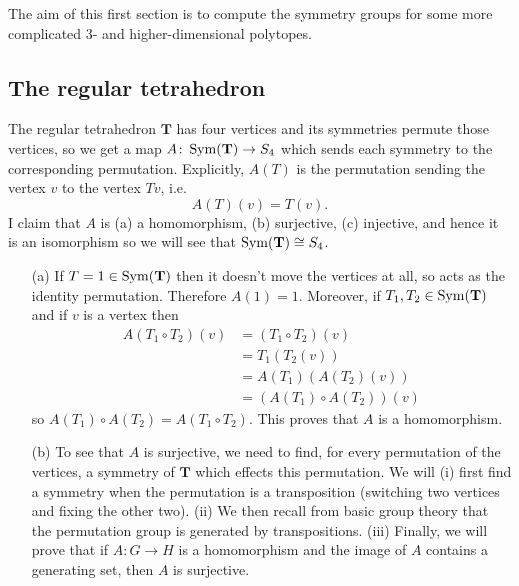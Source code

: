 \documentclass[12pt]{article}
\begin{document}
The aim of this first section is to compute the symmetry groups for some more complicated 3- and higher-dimensional polytopes.

\subsection{The regular tetrahedron}

\begin{exm}
The regular tetrahedron $\mathbf{T}$ has four vertices and its symmetries permute those vertices, so we get a map $A\colon \operatorname{Sym}(\mathbf{T})\to S_4$ which sends each symmetry to the corresponding permutation. Explicitly, $A(T)$ is the permutation sending the vertex $v$ to the vertex $Tv$, i.e.
\[A(T)(v)=T(v).\]
I claim that $A$ is (a) a homomorphism, (b) surjective, (c) injective, and hence it is an isomorphism so we will see that $\operatorname{Sym}(\mathbf{T})\cong S_4$.

\begin{enumerate}
\item[(a)] If $T=1\in\operatorname{Sym}(\mathbf{T})$ then it doesn't move the vertices at all, so acts as the identity permutation. Therefore $A(1)=1$. Moreover, if $T_1,T_2\in\operatorname{Sym}(\mathbf{T})$ and if $v$ is a vertex then
\begin{align*}
A(T_1\circ T_2)(v)&=(T_1\circ T_2)(v)\\
&=T_1(T_2(v))\\
&=A(T_1)(A(T_2)(v))\\
&=(A(T_1)\circ A(T_2))(v)
\end{align*}
so $A(T_1)\circ A(T_2)=A(T_1\circ T_2)$. This proves that $A$ is a homomorphism.

\item[(b)] To see that $A$ is surjective, we need to find, for every permutation of the vertices, a symmetry of $\mathbf{T}$ which effects this permutation. We will (i) first find a symmetry when the permutation is a transposition (switching two vertices and fixing the other two). (ii) We then recall from basic group theory that the permutation group is generated by transpositions. (iii) Finally, we will prove that if $A\colon G\to H$ is a homomorphism and the image of $A$ contains a generating set, then $A$ is surjective.


\end{enumerate}
\end{exm}
\end{document}
